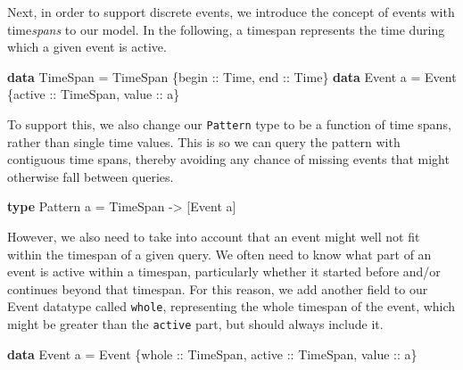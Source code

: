 \documentclass[
]{article}
\newenvironment{Shaded}{}{}
\newcommand{\DataTypeTok}[1]{\textcolor[rgb]{0.56,0.13,0.00}{#1}}
\newcommand{\KeywordTok}[1]{\textcolor[rgb]{0.00,0.44,0.13}{\textbf{#1}}}
\newcommand{\NormalTok}[1]{#1}
\newcommand{\OtherTok}[1]{\textcolor[rgb]{0.00,0.44,0.13}{#1}}
\begin{document}
Next, in order to support discrete events, we introduce the concept of
events with time\emph{spans} to our model. In the following, a timespan
represents the time during which a given event is active.

\begin{Shaded}
\begin{Highlighting}[]
\KeywordTok{data} \DataTypeTok{TimeSpan} \OtherTok{=} \DataTypeTok{TimeSpan}\NormalTok{ \{}\OtherTok{begin ::} \DataTypeTok{Time}\NormalTok{,}\OtherTok{ end ::} \DataTypeTok{Time}\NormalTok{\}}
\KeywordTok{data} \DataTypeTok{Event}\NormalTok{ a }\OtherTok{=} \DataTypeTok{Event}\NormalTok{ \{}\OtherTok{active ::} \DataTypeTok{TimeSpan}\NormalTok{,}\OtherTok{ value ::}\NormalTok{ a\}}
\end{Highlighting}
\end{Shaded}

To support this, we also change our \texttt{Pattern} type to be a
function of time spans, rather than single time values. This is so we
can query the pattern with contiguous time spans, thereby avoiding any
chance of missing events that might otherwise fall between queries.

\begin{Shaded}
\begin{Highlighting}[]
\KeywordTok{type} \DataTypeTok{Pattern}\NormalTok{ a }\OtherTok{=} \DataTypeTok{TimeSpan} \OtherTok{{-}\textgreater{}}\NormalTok{ [}\DataTypeTok{Event}\NormalTok{ a]}
\end{Highlighting}
\end{Shaded}

However, we also need to take into account that an event might well not
fit within the timespan of a given query. We often need to know what
part of an event is active within a timespan, particularly whether it
started before and/or continues beyond that timespan. For this reason,
we add another field to our Event datatype called \texttt{whole},
representing the whole timespan of the event, which might be greater
than the \texttt{active} part, but should always include it.

\begin{Shaded}
\begin{Highlighting}[]
\KeywordTok{data} \DataTypeTok{Event}\NormalTok{ a }\OtherTok{=} \DataTypeTok{Event}\NormalTok{ \{}\OtherTok{whole ::} \DataTypeTok{TimeSpan}\NormalTok{,}\OtherTok{ active ::} \DataTypeTok{TimeSpan}\NormalTok{,}\OtherTok{ value ::}\NormalTok{ a\}}
\end{Highlighting}
\end{Shaded}
\end{document}
